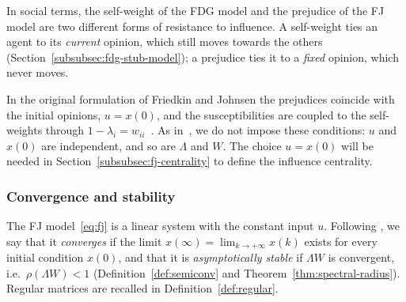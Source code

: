In social terms, the self-weight of the FDG model and the prejudice of the FJ model are
two different forms of resistance to influence. A self-weight ties an agent to its
\emph{current} opinion, which still moves towards the others
(Section~\ref{subsubsec:fdg-stub-model}); a prejudice ties it to a \emph{fixed}
opinion, which never moves.

In the original formulation of Friedkin and Johnsen the prejudices coincide with the
initial opinions, $u = x(0)$, and the susceptibilities are coupled to the self-weights
through $1 - \lambda_i = w_{ii}$~\cite{proskurnikov2017tutorial}. As
in~\cite{proskurnikov2017tutorial}, we do not impose these conditions: $u$ and $x(0)$
are independent, and so are $\Lambda$ and $W$. The choice $u = x(0)$ will be needed in
Section~\ref{subsubsec:fj-centrality} to define the influence centrality.

\subsubsection{Convergence and stability}
\label{subsubsec:fj-conv}

The FJ model~\eqref{eq:fj} is a linear system with the constant input $u$. Following
\cite{proskurnikov2017tutorial}, we say that it \emph{converges} if the limit
$x(\infty) = \lim_{k \to +\infty} x(k)$ exists for every initial condition $x(0)$, and
that it is \emph{asymptotically stable} if $\Lambda W$ is convergent, i.e.\
$\rho(\Lambda W) < 1$ (Definition~\ref{def:semiconv} and
Theorem~\ref{thm:spectral-radius}). Regular matrices are recalled in Definition~\ref{def:regular}.

